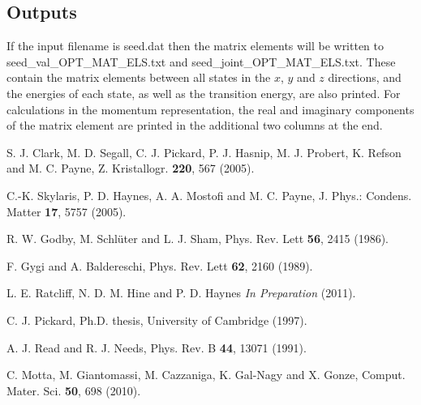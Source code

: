 \documentclass[a4paper,oneside,11pt]{article}
\begin{document}
\subsection*{Outputs}

If the input filename is seed.dat then the matrix elements will be written to seed\_val\_OPT\_MAT\_ELS.txt and seed\_joint\_OPT\_MAT\_ELS.txt.  These contain the matrix elements between all states in the $x$, $y$ and $z$ directions, and the energies of each state, as well as the transition energy, are also printed.  For calculations in the momentum representation, the real and imaginary components of the matrix element are printed in the additional two columns at the end.

\begin{thebibliography}{13}

S. J. Clark, M. D. Segall, C. J. Pickard, P. J. Hasnip, M. J. Probert, K. Refson and M. C. Payne,
   Z. Kristallogr. \textbf{220}, 567 (2005).

C.-K. Skylaris, P. D. Haynes, A. A. Mostofi and M. C. Payne,
   J. Phys.: Condens. Matter \textbf{17}, 5757 (2005).

R. W. Godby, M. Schl\"{u}ter and L. J. Sham, 
	Phys. Rev. Lett \textbf{56}, 2415 (1986).

F. Gygi and A. Baldereschi, 
	Phys. Rev. Lett \textbf{62}, 2160 (1989).

L. E. Ratcliff, N. D. M. Hine and P. D. Haynes 
	\emph{In Preparation} (2011).

C. J. Pickard,
   Ph.D. thesis, University of Cambridge (1997).

A. J. Read and R. J. Needs,
   Phys. Rev. B \textbf{44}, 13071 (1991).

C. Motta, M. Giantomassi, M. Cazzaniga, K. Gal-Nagy and X. Gonze,
   Comput. Mater. Sci. \textbf{50}, 698 (2010).


\end{thebibliography}



\end{document}
